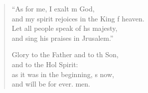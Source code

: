 \begin{verse}
\begin{patverse}
    “As for me, I exalt m God,\Med\\
    and my spirit rejoices in the King f heaven.\\
    Let all people speak of h\pointup{\i}s majesty,\Med\\
    and sing his praises in Jrusalem.”

    Glory to the Father and to th Son,\Med\\
    and to the Hol Spirit:\\
    as it was in the beginning, \pointup{\i}s now,\Med\\
    and will be for ever. men.
  \end{patverse}
\end{verse}
